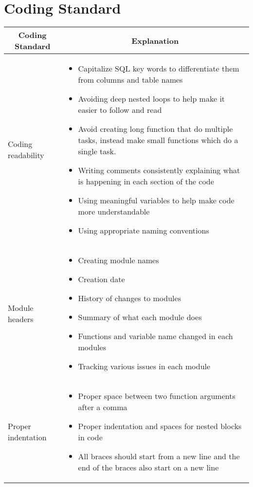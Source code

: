 \documentclass[12pt]{article}
\begin{document}
\section{Coding Standard}


	\begin{longtable}{|p{6cm}|p{10cm}|}
		\hline
		\multicolumn{1}{|c|}{\textbf{Coding Standard}} & \multicolumn{1}{c|}{\textbf{Explanation}} 
		\\ \hline
		Coding readability
		&  
		\begin{itemize}
			\item Capitalize SQL key words to differentiate them from columns and table names
			\item Avoiding deep nested loops to help make it easier to follow and read
			\item Avoid creating long function that do multiple tasks, instead make small functions which do a single task.
			\item Writing comments consistently explaining what is happening in each section of the code
			\item Using meaningful variables to help make code more understandable
			\item Using appropriate naming conventions
		\end{itemize}                                 
		\\ \hline
		Module headers
		&  
		\begin{itemize}
			\item Creating module names
			\item Creation date
			\item History of changes to modules
			\item Summary of what each module does
			\item Functions and variable name changed in each modules
			\item Tracking various issues in each module
		\end{itemize} 
								
		\\ \hline
		Proper indentation
		&
		\begin{itemize}
			\item Proper space between two function arguments after a comma
			\item Proper indentation and spaces for nested blocks in code
			\item All braces should start from a new line and the end of the braces also start on a new line
		\end{itemize}
									
		\\ \hline
	\end{longtable}
\end{document}
